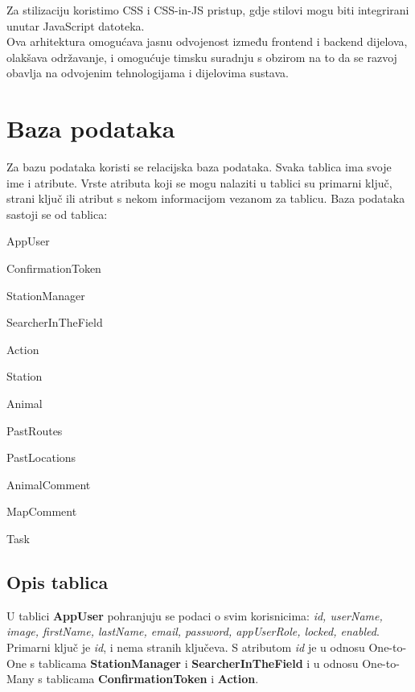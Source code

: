	Za stilizaciju koristimo CSS i CSS-in-JS pristup, gdje stilovi mogu biti integrirani unutar JavaScript datoteka.
	\\
	Ova arhitektura omogućava jasnu odvojenost između frontend i backend dijelova, olakšava održavanje, i omogućuje timsku suradnju s obzirom na to da se razvoj obavlja na odvojenim tehnologijama i dijelovima sustava.
		

		

				
		\section{Baza podataka}
				
				Za bazu podataka koristi se relacijska baza podataka. Svaka tablica ima svoje ime i atribute. Vrste atributa koji se mogu nalaziti u tablici su primarni ključ, strani ključ ili atribut s nekom informacijom vezanom za tablicu. Baza podataka sastoji se od tablica:
		
				\begin{packed_item}
					\item AppUser
					\item ConfirmationToken
					\item StationManager
					\item SearcherInTheField
					\item Action
					\item Station
					\item Animal
					\item PastRoutes
					\item PastLocations
					\item AnimalComment
					\item MapComment
					\item Task
				\end{packed_item}
				
				
		
			\subsection{Opis tablica}
			

				U tablici \textbf{AppUser} pohranjuju se podaci o svim korisnicima: \textit{id, userName, image, firstName, lastName, email, password, appUserRole, locked, enabled}. Primarni ključ je \textit{id}, i nema stranih ključeva. S atributom \textit{id} je u odnosu One-to-One s tablicama \textbf{StationManager} i \textbf{SearcherInTheField} i u odnosu One-to-Many s tablicama \textbf{ConfirmationToken} i \textbf{Action}.

